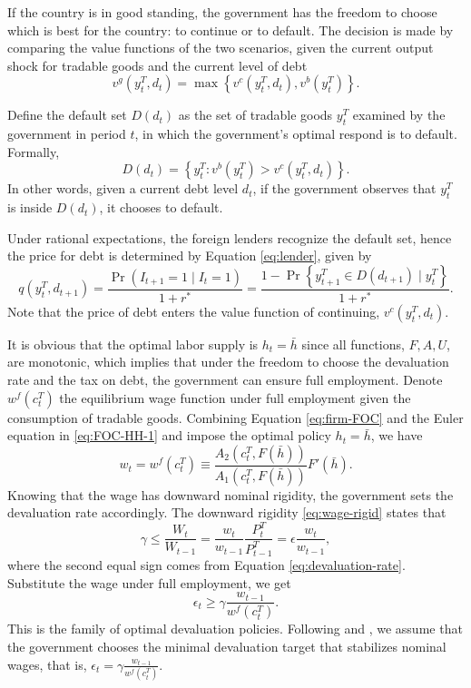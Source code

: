 If the country is in good standing, the government has the freedom to choose which is best for the country: to continue or to default. The decision is made by comparing the value functions of the two scenarios, given the current output shock for tradable goods and the current level of debt
\begin{equation}
    v^g(y^T_t, d_t) = \max\left\{
        v^c(y^T_t, d_t) ,
        v^b(y^T_t)
     \right\}.
\end{equation}

Define the default set $D(d_t)$ as the set of tradable goods $y^T_t$ examined by the government in period $t$, in which the government's optimal respond is to default. Formally,
\begin{equation}
    D(d_t) = \left\{ 
        y^T_t : v^b(y^T_t) > v^c(y^T_t, d_t)
     \right\}.
\end{equation}
In other words, given a current debt level $d_t$, if the government observes that $y^T_t$ is inside $D(d_t)$, it chooses to default.

Under rational expectations, the foreign lenders recognize the default set, hence the price for debt is determined by Equation \eqref{eq:lender}, given by
\begin{equation}
    q(y^T_t, d_{t+1}) = \frac{\Pr(I_{t+1} = 1 \mid I_t = 1)}{1 + r^*} =
    \frac{1 - \Pr\left\{ y^T_{t+1} \in D(d_{t+1}) \mid y^T_t \right\}}{1 + r^*}.
\end{equation}
Note that the price of debt enters the value function of continuing, $v^c(y^T_t, d_{t})$.

It is obvious that the optimal labor supply is $h_t = \bar{h}$ since all functions, $F, A, U$, are monotonic, which implies that under the freedom to choose the devaluation rate and the tax on debt, the government can ensure full employment. Denote $w^f(c^T_t)$ the equilibrium wage function under full employment given the consumption of tradable goods. Combining Equation \eqref{eq:firm-FOC} and the Euler equation in \eqref{eq:FOC-HH-1} and impose the optimal policy $h_t = \bar{h}$, we have
\begin{equation}
    w_t = w^f(c^T_t) \equiv \frac{A_2(c^T_t, F(\bar{h}))}{A_1(c^T_t, F(\bar{h}))} F'(\bar{h}).
\end{equation}
Knowing that the wage has downward nominal rigidity, the government sets the devaluation rate accordingly. The downward rigidity \eqref{eq:wage-rigid} states that
\begin{equation*}
    \gamma \le \frac{W_t}{W_{t-1}} = \frac{w_t}{w_{t-1}} \frac{P^T_t}{P^T_{t-1}} = \epsilon \frac{w_t}{w_{t-1}},
\end{equation*}
where the second equal sign comes from Equation \eqref{eq:devaluation-rate}. Substitute the wage under full employment, we get
\begin{equation}
    \epsilon_t \ge \gamma \frac{w_{t-1}}{w^f(c^T_t)}.
\end{equation}
This is the family of optimal devaluation policies. Following \citet*{Na-18} and \citet*{Hinrichsen_2020-chapter4}, we assume that the government chooses the minimal devaluation target that stabilizes nominal wages, that is, $
    \epsilon_t = \gamma \frac{w_{t-1}}{w^f(c^T_t)}.
$